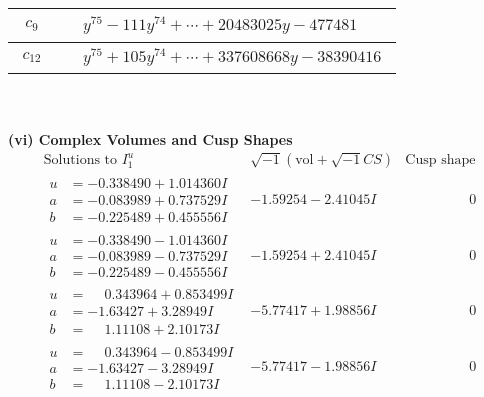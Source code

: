 \documentclass[1p]{elsarticle_modified}
\theoremstyle{definition}
\newcommand{\I}{\sqrt{-1}}
\begin{document}
\begin{tabular}{m{50pt}|m{274pt}}
\hline $$\begin{aligned}c_{9}\end{aligned}$$&$\begin{aligned}
&y^{75}-111 y^{74}+\cdots+20483025 y-477481
\end{aligned}$\\
\hline $$\begin{aligned}c_{12}\end{aligned}$$&$\begin{aligned}
&y^{75}+105 y^{74}+\cdots+337608668 y-38390416
\end{aligned}$\\
\hline
\end{tabular}\\~\\
\newpage\flushleft \textbf{(vi) Complex Volumes and Cusp Shapes}
$$\begin{array}{c|c|c}  
\text{Solutions to }I^u_{1}& \I (\text{vol} + \sqrt{-1}CS) & \text{Cusp shape}\\
 \hline 
\begin{aligned}
u &= -0.338490 + 1.014360 I \\
a &= -0.083989 + 0.737529 I \\
b &= -0.225489 + 0.455556 I\end{aligned}
 & -1.59254 - 2.41045 I & \phantom{-0.000000 } 0 \\ \hline\begin{aligned}
u &= -0.338490 - 1.014360 I \\
a &= -0.083989 - 0.737529 I \\
b &= -0.225489 - 0.455556 I\end{aligned}
 & -1.59254 + 2.41045 I & \phantom{-0.000000 } 0 \\ \hline\begin{aligned}
u &= \phantom{-}0.343964 + 0.853499 I \\
a &= -1.63427 + 3.28949 I \\
b &= \phantom{-}1.11108 + 2.10173 I\end{aligned}
 & -5.77417 + 1.98856 I & \phantom{-0.000000 } 0 \\ \hline\begin{aligned}
u &= \phantom{-}0.343964 - 0.853499 I \\
a &= -1.63427 - 3.28949 I \\
b &= \phantom{-}1.11108 - 2.10173 I\end{aligned}
 & -5.77417 - 1.98856 I & \phantom{-0.000000 } 0 \\ \hline\begin{aligned}

\end{aligned}
\end{array}$$
\end{document}
